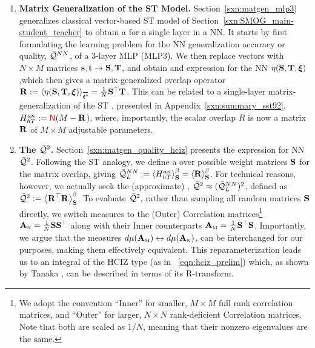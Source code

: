 
\begin{enumerate}[label=5.\arabic*]
\item
\textbf{Matrix Generalization of the ST Model.}
Section~\ref{sxn:matgen_mlp3} generalizes
classical \STATMECH vector-based ST model of Section~\ref{sxn:SMOG_main-student_teacher}
to obtain a \LayerQuality for a single layer in a NN.
It starts by first formulating the learning problem for
the NN generalization accuracy or quality, $\bar{\mathcal{Q}}^{NN}$,
of a 3-layer MLP (MLP3).
We then replace vectors with $N \times M$ matrices ${\mathbf{s}},{\mathbf{t}}\rightarrow{\mathbf{S}},{\mathbf{T}}$,
and obtain and expression for the NN \SelfOverlap $\eta({\mathbf{S}},{\mathbf{T}},\boldsymbol{\xi})$,which then gives a matrix-generalized overlap operator
$\OVERLAP:=\langle\ETA(\SMAT,\TMAT,\XI)\rangle_{\AVGNDXI}=\tfrac{1}{N}\SMAT^{\top}\TMAT$.
This can be related to a single-layer matrix-generalization of the ST \AnnealedHamiltonian, 
presented in Appendix~\ref{sxn:summary_sst92},
$H^{an}_{hT}:={\color{red}\sf{N}}(M-\mathbf{R}$),
where, importantly, the scalar overlap $R$ is now a matrix $\mathbf{R}$ of $M\times M$ adjustable parameters.

\item
\textbf{The \LayerQualitySquared $\bar{\mathcal{Q}}^{2}$.}
Section~\ref{sxn:matgen_quality_hciz} presents the expression for NN \LayerQualitySquared $\bar{\mathcal{Q}}^{2}$.
Following the ST analogy, we define a \ThermalAverage over possible \Student weight matrices ${\mathbf{S}}$
for the matrix overlap, giving $\bar{\mathcal{Q}}^{NN}_{L}:=\left\langle H^{an}_{hT} \right\rangle_{\mathbf S}^{\beta} =\left\langle \mathbf{R} \right\rangle_{\mathbf S}^{\beta}$.
For technical reasons, however, we actually seek the (approximate)  \LayerQualitySquared, $\bar{\mathcal{Q}}^{2}\approx (\bar{\mathcal{Q}}^{NN}_{L})^2$,
defined as $\bar{\mathcal{Q}}^{2}:=\left\langle {\mathbf{R}}^{\top}\mathbf{R} \right\rangle_{\mathbf S}^{\beta}$.
To evaluate $\bar{\mathcal{Q}}^{2}$, rather than sampling all random \Student matrices ${\mathbf{S}}$ directly,
we switch measures to the (Outer) \Student Correlation matrices\footnote{
We adopt the convention ``Inner'' for smaller, $M\times M$ full rank \Student correlation matrices, and ``Outer'' for larger, $N\times N$ rank-deficient \Student Correlation matrices.
Note that both are scaled as $1 / N$, meaning that their nonzero eigenvalues are the same.
} 
${\mathbf{A}}_{\text{\tiny N}} = \tfrac{1}{N}{\mathbf{S}}{\mathbf{S}}^{\top}$ along with their Inner counterparts
${\mathbf{A}}_{\text{\tiny M}} = \tfrac{1}{N}{\mathbf{S}}^{\top}{\mathbf{S}}$.
Importantly, we argue that the measures $d\mu({\mathbf{A}}_{\text{\tiny M}})\leftrightarrow d\mu({\mathbf{A}}_{\text{\tiny N}})$,
can be interchanged for our purposes, making them effectively equivalent.
This reparameterization leads us to an integral of the HCIZ type (as in \EQN~\ref{eqn:hciz_prelim})
which, as shown by Tanaka \cite{Tanaka2007, Tanaka2008}, can be described in terms of its R-transform.


\end{enumerate}
